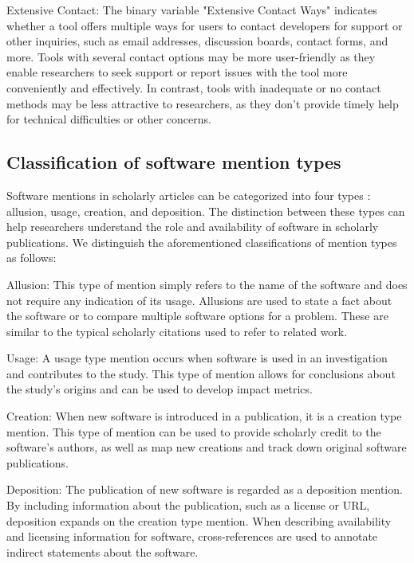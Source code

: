\documentclass{article}
\begin{document}
Extensive Contact: The binary variable "Extensive Contact Ways" indicates whether a tool offers multiple ways for users to contact developers for support or other inquiries, such as email addresses, discussion boards, contact forms, and more. Tools with several contact options may be more user-friendly as they enable researchers to seek support or report issues with the tool more conveniently and effectively. In contrast, tools with inadequate or no contact methods may be less attractive to researchers, as they don't provide timely help for technical difficulties or other concerns.


\subsection{Classification of software mention types}


Software mentions in scholarly articles can be categorized into four types \cite{schindler_annotation_2019, schindler_somesci-_2021}: allusion, usage, creation, and deposition. The distinction between these types can help researchers understand the role and availability of software in scholarly publications. We distinguish the aforementioned classifications of mention types as follows:
 
Allusion: This type of mention simply refers to the name of the software and does not require any indication of its usage. Allusions are used to state a fact about the software or to compare multiple software options for a problem. These are similar to the typical scholarly citations used to refer to related work.
 
Usage: A usage type mention occurs when software is used in an investigation and contributes to the study. This type of mention allows for conclusions about the study's origins and can be used to develop impact metrics. 
 
Creation: When new software is introduced in a publication, it is a creation type mention. This type of mention can be used to provide scholarly credit to the software's authors, as well as map new creations and track down original software publications.
 
Deposition: The publication of new software is regarded as a deposition mention. By including information about the publication, such as a license or URL, deposition expands on the creation type mention. When describing availability and licensing information for software, cross-references are used to annotate indirect statements about the software.
 
\end{document}
